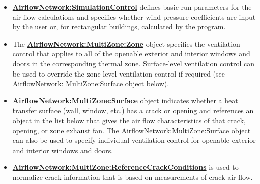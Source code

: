 \begin{itemize}
\item
  \textbf{\hyperref[airflownetworksimulationcontrol]{AirflowNetwork:\hyperref[simulationcontrol]{SimulationControl}}} defines basic run parameters for the air flow calculations and specifies whether wind pressure coefficients are input by the user or, for rectangular buildings, calculated by the program.
\item
  The \textbf{\hyperref[airflownetworkmultizonezone]{AirflowNetwork:MultiZone:Zone}} object specifies the ventilation control that applies to all of the openable exterior and interior windows and doors in the corresponding thermal zone. Surface-level ventilation control can be used to override the zone-level ventilation control if required (see AirflowNetwork: MultiZone:Surface object below).
\item
  \textbf{\hyperref[airflownetworkmultizonesurface]{AirflowNetwork:MultiZone:Surface}} object indicates whether a heat transfer surface (wall, window, etc.) has a crack or opening and references an object in the list below that gives the air flow characteristics of that crack, opening, or zone exhaust fan. The \hyperref[airflownetworkmultizonesurface]{AirflowNetwork:MultiZone:Surface} object can also be used to specify individual ventilation control for openable exterior and interior windows and doors.
\item
  \textbf{\hyperref[airflownetworkmultizonereferencecrackconditions]{AirflowNetwork:MultiZone:ReferenceCrackConditions}} is used to normalize crack information that is based on measurements of crack air flow.

\end{itemize}
